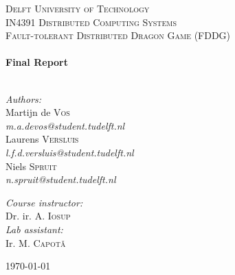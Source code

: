 \begin{titlepage}

\begin{center}


\textsc{\Large Delft University of Technology }\\[1.5cm]

\textsc{\large IN4391 Distributed Computing Systems}\\[0.5cm]
\textsc{\normalsize Fault-tolerant Distributed Dragon Game (FDDG)}\\[0.5cm]


\HRule \\[0.4cm]
{ \huge \bfseries Final Report}\\[0.4cm]

\HRule \\[1.5cm]

\begin{minipage}{0.4\textwidth}
\begin{flushleft} \large
\emph{Authors:}\\
Martijn de \textsc{Vos} \\ [0.1cm]
\emph{m.a.devos@student.tudelft.nl} \\ [0.1cm]
Laurens \textsc{Versluis} \\ [0.1cm]
\emph{l.f.d.versluis@student.tudelft.nl} \\ [0.1cm]
Niels \textsc{Spruit} \\ [0.1cm]
\emph{n.spruit@student.tudelft.nl} \\ [0.1cm]
\end{flushleft}
\end{minipage}
\begin{minipage}{0.4\textwidth}
\begin{flushright} \large
\emph{Course instructor:} \\
Dr. ir. A. \textsc{Iosup}\\
\emph{Lab assistant:} \\
Ir. M. \textsc{Capot\v{a}} 
\end{flushright}
\end{minipage}
\vspace{30mm}

\vfill

{\large \today}

\end{center}

\end{titlepage}